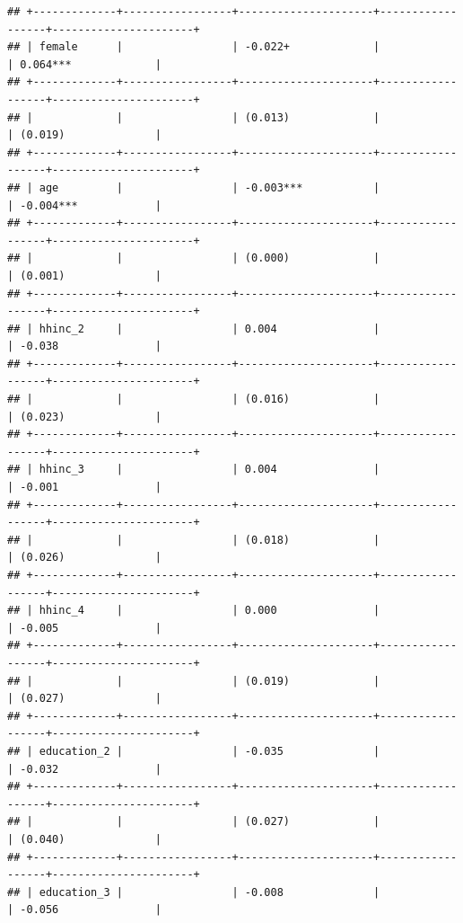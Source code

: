 \documentclass[
]{article}
\begin{document}
\begin{verbatim}
## +-------------+-----------------+---------------------+------------------+----------------------+
## | female      |                 | -0.022+             |                  | 0.064***             |
## +-------------+-----------------+---------------------+------------------+----------------------+
## |             |                 | (0.013)             |                  | (0.019)              |
## +-------------+-----------------+---------------------+------------------+----------------------+
## | age         |                 | -0.003***           |                  | -0.004***            |
## +-------------+-----------------+---------------------+------------------+----------------------+
## |             |                 | (0.000)             |                  | (0.001)              |
## +-------------+-----------------+---------------------+------------------+----------------------+
## | hhinc_2     |                 | 0.004               |                  | -0.038               |
## +-------------+-----------------+---------------------+------------------+----------------------+
## |             |                 | (0.016)             |                  | (0.023)              |
## +-------------+-----------------+---------------------+------------------+----------------------+
## | hhinc_3     |                 | 0.004               |                  | -0.001               |
## +-------------+-----------------+---------------------+------------------+----------------------+
## |             |                 | (0.018)             |                  | (0.026)              |
## +-------------+-----------------+---------------------+------------------+----------------------+
## | hhinc_4     |                 | 0.000               |                  | -0.005               |
## +-------------+-----------------+---------------------+------------------+----------------------+
## |             |                 | (0.019)             |                  | (0.027)              |
## +-------------+-----------------+---------------------+------------------+----------------------+
## | education_2 |                 | -0.035              |                  | -0.032               |
## +-------------+-----------------+---------------------+------------------+----------------------+
## |             |                 | (0.027)             |                  | (0.040)              |
## +-------------+-----------------+---------------------+------------------+----------------------+
## | education_3 |                 | -0.008              |                  | -0.056               |

\end{verbatim}
\end{document}
